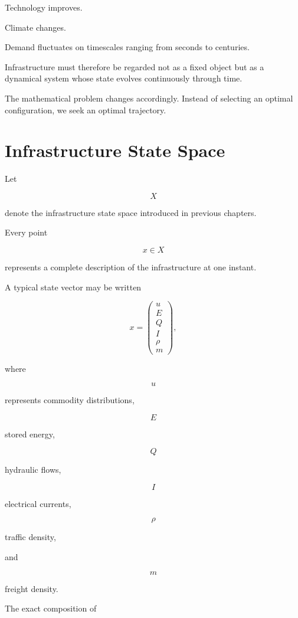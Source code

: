 \documentclass[11pt,fleqn]{book}
\numberwithin{equation}{chapter}
\theoremstyle{plain}
\theoremstyle{definition}
\theoremstyle{remark}
\begin{document}
Technology improves.

Climate changes.

Demand fluctuates on timescales ranging from seconds to centuries.

Infrastructure must therefore be regarded not as a fixed object but as a
dynamical system whose state evolves continuously through time.

The mathematical problem changes accordingly. Instead of selecting an
optimal configuration, we seek an optimal trajectory.


\section{Infrastructure State Space}

Let

\[
X
\]

denote the infrastructure state space introduced in previous chapters.

Every point

\[
x\in X
\]

represents a complete description of the infrastructure at one instant.

A typical state vector may be written

\[
x=
\begin{pmatrix}
u\\
E\\
Q\\
I\\
\rho\\
m
\end{pmatrix},
\]

where

\[
u
\]

represents commodity distributions,

\[
E
\]

stored energy,

\[
Q
\]

hydraulic flows,

\[
I
\]

electrical currents,

\[
\rho
\]

traffic density,

and

\[
m
\]

freight density.

The exact composition of
\end{document}
